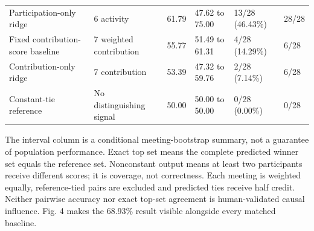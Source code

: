 \documentclass[journal]{IEEEtran}
\begin{document}
\begin{table}[t]
\begin{tabular}{p{}p{}p{}p{}p{}p{}}
{\raggedright Participation-only ridge\par} & {\raggedright 6 activity\par} & {\raggedright 61.79\par} & {\raggedright 47.62 to 75.00\par} & {\raggedright 13/28 (46.43\%)\par} & {\raggedright 28/28\par} \\
{\raggedright Fixed contribution-score baseline\par} & {\raggedright 7 weighted contribution\par} & {\raggedright 55.77\par} & {\raggedright 51.49 to 61.31\par} & {\raggedright 4/28 (14.29\%)\par} & {\raggedright 6/28\par} \\
{\raggedright Contribution-only ridge\par} & {\raggedright 7 contribution\par} & {\raggedright 53.39\par} & {\raggedright 47.32 to 59.76\par} & {\raggedright 2/28 (7.14\%)\par} & {\raggedright 6/28\par} \\
{\raggedright Constant-tie reference\par} & {\raggedright No distinguishing signal\par} & {\raggedright 50.00\par} & {\raggedright 50.00 to 50.00\par} & {\raggedright 0/28 (0.00\%)\par} & {\raggedright 0/28\par} \\
\bottomrule
\end{tabular}
\end{table}
The interval column is a conditional meeting-bootstrap summary, not a guarantee of population performance. Exact top set means the complete predicted winner set equals the reference set. Nonconstant output means at least two participants receive different scores; it is coverage, not correctness. Each meeting is weighted equally, reference-tied pairs are excluded and predicted ties receive half credit. Neither pairwise accuracy nor exact top-set agreement is human-validated causal influence. Fig. 4 makes the 68.93\% result visible alongside every matched baseline.
\end{document}

